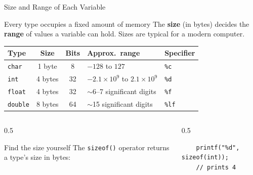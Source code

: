 \documentclass[aspectratio=169]{beamer}
\begin{document}
	\begin{frame}[fragile]{Size and Range of Each Variable}
		\begin{block}{Every type occupies a fixed amount of memory}
			The \textbf{size} (in bytes) decides the \textbf{range} of values a variable can hold. Sizes are typical for a modern computer.
		\end{block}
		\renewcommand{\arraystretch}{1.25}
		\centering
		\begin{tabular}{@{}lccll@{}}
			\toprule
			\textbf{Type} & \textbf{Size} & \textbf{Bits} & \textbf{Approx.\ range} & \textbf{Specifier} \\
			\midrule
			\texttt{char}   & 1 byte & 8  & $-128$ to $127$                & \texttt{\%c} \\
			\texttt{int}    & 4 bytes & 32 & $-2.1\times10^{9}$ to $2.1\times10^{9}$ & \texttt{\%d} \\
			\texttt{float}  & 4 bytes & 32 & $\sim$6--7 significant digits  & \texttt{\%f} \\
			\texttt{double} & 8 bytes & 64 & $\sim$15 significant digits    & \texttt{\%lf} \\
			\bottomrule
		\end{tabular}
		\vspace{0.2cm}
		\begin{columns}[T]
			\begin{column}{0.5\textwidth}
				\begin{block}{Find the size yourself}
					\small The \texttt{sizeof()} operator returns a type's size in bytes:
				\end{block}
			\end{column}
			\begin{column}{0.5\textwidth}
\begin{lstlisting}
	printf("%d", sizeof(int));
	// prints 4
\end{lstlisting}
			\end{column}
		\end{columns}
	\end{frame}
	
\end{document}
